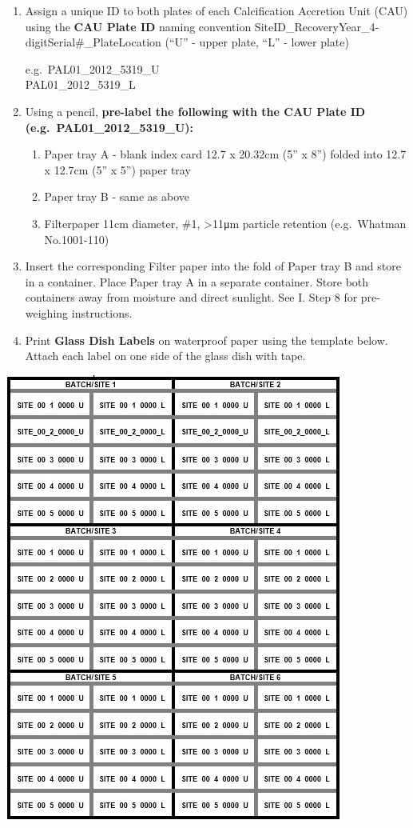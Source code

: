 \documentclass[
]{book}
\providecommand{\tightlist}{%
  \setlength{\itemsep}{0pt}\setlength{\parskip}{0pt}}
\begin{document}
\begin{enumerate}
\def\labelenumi{\arabic{enumi}.}
\item
  Assign a unique ID to both plates of each Calcification Accretion Unit (CAU) using the \textbf{CAU Plate ID} naming convention SiteID\_RecoveryYear\_4-digitSerial\#\_PlateLocation (``U'' - upper plate, ``L'' - lower plate)

  e.g.~PAL01\_2012\_5319\_U\\
  PAL01\_2012\_5319\_L
\item
  Using a pencil, \textbf{pre-label the following with the CAU Plate ID (e.g.~PAL01\_2012\_5319\_U):}

  \begin{enumerate}
  \def\labelenumii{\alph{enumii}.}
  \tightlist
  \item
    Paper tray A - blank index card 12.7 x 20.32cm (5'' x 8'') folded into 12.7 x 12.7cm (5'' x 5'') paper tray\\
  \item
    Paper tray B - same as above\\
  \item
    Filterpaper 11cm diameter, \#1, \textgreater11μm particle retention (e.g.~Whatman No.1001-110)
  \end{enumerate}
\item
  Insert the corresponding Filter paper into the fold of Paper tray B and store in a container. Place Paper tray A in a separate container. Store both containers away from moisture and direct sunlight. See I. Step 8 for pre-weighing instructions.
\item
  Print \textbf{Glass Dish Labels} on waterproof paper using the template below. Attach each label on one side of the glass dish with tape.
\end{enumerate}

\includegraphics{images/Template1.jpg}
\end{document}
